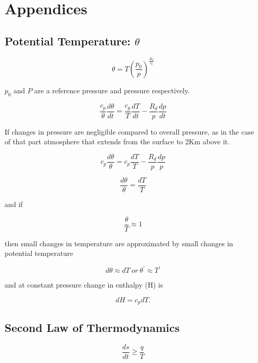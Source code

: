 \chapter{Appendices}
\section{Potential Temperature: $\theta$}

\label{sec:pottemp}

\begin{equation}
\theta = T \left(\frac{p_{0}}{p} \right)^{\frac{R_{d}}{c_{p}}} 
\end{equation}

$p_{0}$ and $P$ are a reference pressure and pressure respectively. 

\begin{equation}
\frac{c_{p}}{\theta}\frac{d\theta}{dt} = \frac{c_{p}}{T} \frac{dT}{dt} - \frac{R_{d}}{p}\frac{dp}{dt} 
\end{equation}

If changes in pressure are negligible compared to overall pressure, as in the case of that part atmosphere that extends from the surface to 2Km above it. 

\begin{equation}
c_{p}\frac{d\theta}{\theta} = c_{p}\frac{dT}{T} - \frac{R_{d}}{p}\frac{dp}{p} 
\end{equation}

\begin{equation}
\frac{d\theta}{\theta} = \frac{dT}{T} 
\end{equation}

and if 

\begin{equation}
\frac{\theta}{T} \approx 1 
\end{equation}

then small changes in temperature are approximated by small changes in potential temperature

\begin{equation}
d\theta \approx dT \ or \ \theta^{'} \approx T^{'}
\end{equation}

and at constant pressure change in enthalpy (H) is 

\begin{equation}
dH = c_{p}dT.
\end{equation}

\section{Second Law of Thermodynamics}
\begin{equation}
\frac{ds}{dt} \ge \frac{q}{T}
\end{equation}

